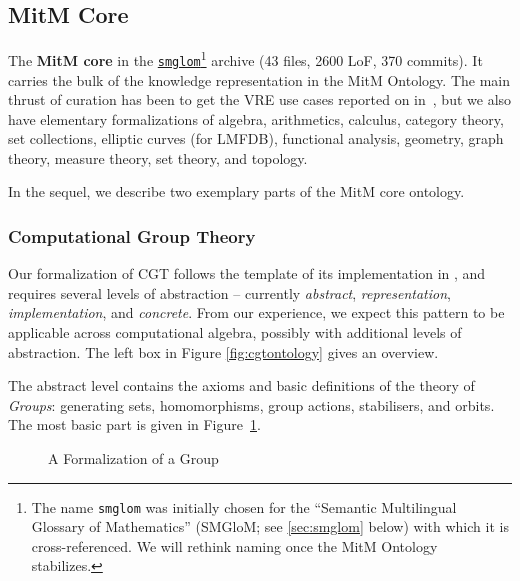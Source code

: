 \subsection{MitM Core}

The \textbf{MitM core} in the
  \href{https://gl.mathhub.info/MitM/smglom}{\texttt{smglom}}\footnote{The name
    \texttt{smglom} was initially chosen for the ``Semantic Multilingual Glossary of
    Mathematics'' (SMGloM; see \ref{sec:smglom} below) with which it is
    cross-referenced. We will rethink naming once the MitM Ontology stabilizes.}  archive
  (43 files, 2600 LoF, 370 commits). It carries the bulk of the knowledge representation in
  the MitM Ontology. The main thrust of curation has been to get the VRE use cases
  reported on in~\cite{ODK-D6.5}, but we also have elementary formalizations of algebra,
  arithmetics, calculus, category theory, set collections, elliptic curves (for LMFDB),
  functional analysis, geometry, graph theory, measure theory, set theory, and topology.


In the sequel, we describe two exemplary parts of the MitM core ontology.

\subsubsection{Computational Group Theory}

Our formalization of CGT follows the template of its implementation in \GAP, and requires several levels of abstraction -- currently \emph{abstract}, \emph{representation}, \emph{implementation}, and \emph{concrete}. From our experience, we expect this pattern to be applicable across computational algebra, possibly with additional levels of abstraction. 
The left box in Figure \ref{fig:cgtontology} gives an overview.

The abstract level contains the axioms and basic definitions of the theory of \emph{Groups}: generating sets, homomorphisms, group actions, stabilisers, and orbits.
The most basic part is given in Figure~\ref{fig:mitm1}. 
\begin{figure}[ht]\centering
  \caption{A Formalization of a Group}\label{fig:mitm1}
\end{figure}

